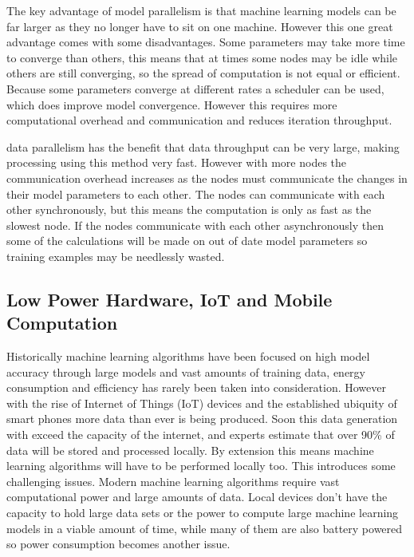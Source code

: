 The key advantage of model parallelism is that machine learning models can be
far larger as they no longer have to sit on one machine. However this one great
advantage comes with some disadvantages. Some parameters may take more time to
converge than others, this means that at times some nodes may be idle while
others are still converging, so the spread of computation is not equal or
efficient. \cite{Dean2012Distbelief} Because some parameters converge at
different rates a scheduler can be used, which does improve model convergence.
However this requires more computational overhead and communication and reduces
iteration throughput.
\cite{kim2016STRADS}

data parallelism has the benefit that data throughput can be very large, making
processing using this method very fast. However with more nodes the
communication overhead increases as the nodes must communicate the changes in
their model parameters to each other. \cite{elgabli2020gadmm} The nodes can
communicate with each other synchronously, but this means the computation is
only as fast as the slowest node. If the nodes communicate with each other
asynchronously then some of the calculations will be made on out of date model
parameters so training examples may be needlessly wasted.

\subsection{Low Power Hardware, IoT and Mobile Computation}

Historically machine learning algorithms have been focused on high model
accuracy through large models and vast amounts of training data, energy
consumption and efficiency has rarely been taken into consideration. However
with the rise of Internet of Things (IoT) devices and the established ubiquity
of smart phones more data than ever is being produced. Soon this data generation
with exceed the capacity of the internet, and experts estimate that over 90\% of
data will be stored and processed locally. \cite{Chaing2016FogIoT} By extension
this means machine learning algorithms will have to be performed locally too.
This introduces some challenging issues. Modern machine learning algorithms
require vast computational power and large amounts of data. Local devices don't
have the capacity to hold large data sets or the power to compute large machine
learning models in a viable amount of time, while many of them are also battery
powered so power consumption becomes another issue.

